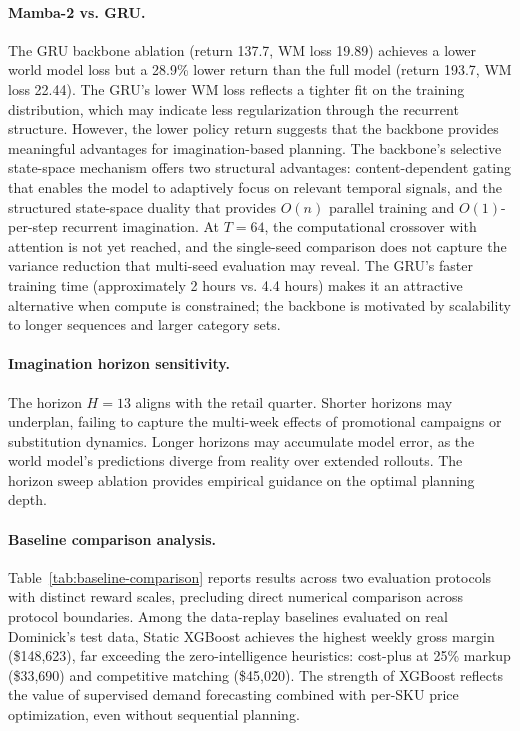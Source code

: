 \paragraph{Mamba-2 vs. GRU.} The GRU backbone ablation (return 137.7, WM loss 19.89) achieves a lower world model loss but a 28.9\% lower return than the full \mamba{} model (return 193.7, WM loss 22.44). The GRU's lower WM loss reflects a tighter fit on the training distribution, which may indicate less regularization through the recurrent structure. However, the lower policy return suggests that the \mamba{} backbone provides meaningful advantages for imagination-based planning. The \mamba{} backbone's selective state-space mechanism offers two structural advantages: content-dependent gating that enables the model to adaptively focus on relevant temporal signals, and the structured state-space duality \citep{dao2024mamba2} that provides $O(n)$ parallel training and $O(1)$-per-step recurrent imagination. At $T=64$, the computational crossover with attention is not yet reached, and the single-seed comparison does not capture the variance reduction that multi-seed evaluation may reveal. The GRU's faster training time (approximately 2 hours vs. 4.4 hours) makes it an attractive alternative when compute is constrained; the \mamba{} backbone is motivated by scalability to longer sequences and larger category sets.

\paragraph{Imagination horizon sensitivity.} The horizon $H=13$ aligns with the retail quarter. Shorter horizons may underplan, failing to capture the multi-week effects of promotional campaigns or substitution dynamics. Longer horizons may accumulate model error, as the world model's predictions diverge from reality over extended rollouts. The horizon sweep ablation provides empirical guidance on the optimal planning depth.

\paragraph{Baseline comparison analysis.} Table~\ref{tab:baseline-comparison} reports results across two evaluation protocols with distinct reward scales, precluding direct numerical comparison across protocol boundaries. Among the data-replay baselines evaluated on real Dominick's test data, Static XGBoost achieves the highest weekly gross margin (\$148{,}623), far exceeding the zero-intelligence heuristics: cost-plus at 25\% markup (\$33{,}690) and competitive matching (\$45{,}020). The strength of XGBoost reflects the value of supervised demand forecasting combined with per-SKU price optimization, even without sequential planning.

